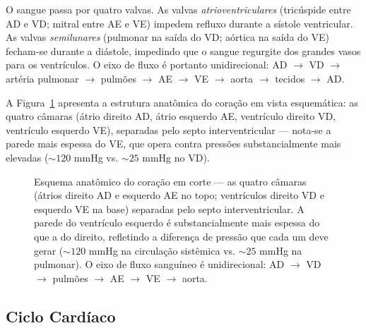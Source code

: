 O sangue passa por quatro valvas. As valvas \emph{atrioventriculares}
(tricúspide entre AD e VD; mitral entre AE e VE) impedem refluxo durante
a sístole ventricular. As valvas \emph{semilunares} (pulmonar na saída do
VD; aórtica na saída do VE) fecham-se durante a diástole, impedindo que
o sangue regurgite dos grandes vasos para os ventrículos. O eixo de
fluxo é portanto unidirecional: AD $\to$ VD $\to$ artéria pulmonar
$\to$ pulmões $\to$ AE $\to$ VE $\to$ aorta $\to$ tecidos $\to$ AD.

A Figura~\ref{fig:12-coracao} apresenta a estrutura anatômica do
coração em vista esquemática: as quatro câmaras (átrio direito AD,
átrio esquerdo AE, ventrículo direito VD, ventrículo esquerdo VE),
separadas pelo septo interventricular --- nota-se a parede mais
espessa do VE, que opera contra pressões substancialmente mais
elevadas ($\sim 120$ mmHg vs. $\sim 25$ mmHg no VD).

\begin{figure}[htbp]
\centering
{}
\caption{Esquema anatômico do coração em corte --- as quatro câmaras (átrios direito AD e esquerdo AE no topo; ventrículos direito VD e esquerdo VE na base) separadas pelo septo interventricular. A parede do ventrículo esquerdo é substancialmente mais espessa do que a do direito, refletindo a diferença de pressão que cada um deve gerar ($\sim 120$ mmHg na circulação sistêmica vs. $\sim 25$ mmHg na pulmonar). O eixo de fluxo sanguíneo é unidirecional: AD $\to$ VD $\to$ pulmões $\to$ AE $\to$ VE $\to$ aorta.}
\label{fig:12-coracao}
\end{figure}

\subsection{Ciclo Cardíaco}
\label{sub:image12-ciclo}

